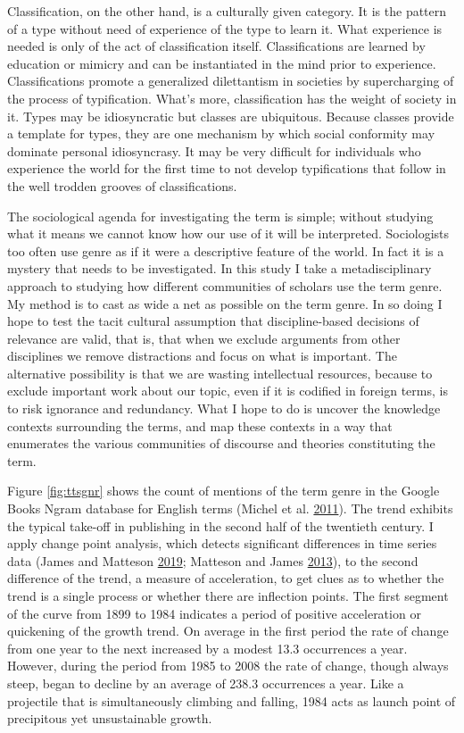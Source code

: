 \documentclass[]{book}
\theoremstyle{definition}
\theoremstyle{definition}
\theoremstyle{definition}
\theoremstyle{remark}
\begin{document}
Classification, on the other hand, is a culturally given category. It is
the pattern of a type without need of experience of the type to learn
it. What experience is needed is only of the act of classification
itself. Classifications are learned by education or mimicry and can be
instantiated in the mind prior to experience. Classifications promote a
generalized dilettantism in societies by supercharging of the process of
typification. What's more, classification has the weight of society in
it. Types may be idiosyncratic but classes are ubiquitous. Because
classes provide a template for types, they are one mechanism by which
social conformity may dominate personal idiosyncrasy. It may be very
difficult for individuals who experience the world for the first time to
not develop typifications that follow in the well trodden grooves of
classifications.

The sociological agenda for investigating the term is simple; without
studying what it means we cannot know how our use of it will be
interpreted. Sociologists too often use genre as if it were a
descriptive feature of the world. In fact it is a mystery that needs to
be investigated. In this study I take a metadisciplinary approach to
studying how different communities of scholars use the term genre. My
method is to cast as wide a net as possible on the term genre. In so
doing I hope to test the tacit cultural assumption that discipline-based
decisions of relevance are valid, that is, that when we exclude
arguments from other disciplines we remove distractions and focus on
what is important. The alternative possibility is that we are wasting
intellectual resources, because to exclude important work about our
topic, even if it is codified in foreign terms, is to risk ignorance and
redundancy. What I hope to do is uncover the knowledge contexts
surrounding the terms, and map these contexts in a way that enumerates
the various communities of discourse and theories constituting the term.

Figure \ref{fig:ttsgnr} shows the count of mentions of the term genre in
the Google Books Ngram database for English terms (Michel et al.
\protect\hyperlink{ref-Michel2011Quantitative}{2011}). The trend
exhibits the typical take-off in publishing in the second half of the
twentieth century. I apply change point analysis, which detects
significant differences in time series data (James and Matteson
\protect\hyperlink{ref-James2019ecp}{2019}; Matteson and James
\protect\hyperlink{ref-Matteson2013Nonparametric}{2013}), to the second
difference of the trend, a measure of acceleration, to get clues as to
whether the trend is a single process or whether there are inflection
points. The first segment of the curve from 1899 to 1984 indicates a
period of positive acceleration or quickening of the growth trend. On
average in the first period the rate of change from one year to the next
increased by a modest 13.3 occurrences a year. However, during the
period from 1985 to 2008 the rate of change, though always steep, began
to decline by an average of 238.3 occurrences a year. Like a projectile
that is simultaneously climbing and falling, 1984 acts as launch point
of precipitous yet unsustainable growth.
\end{document}
